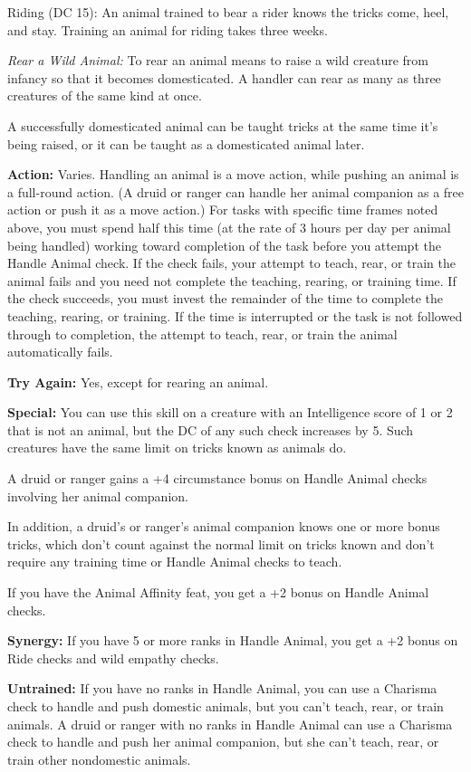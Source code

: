 \documentclass{article}
\begin{document}
Riding (DC 15): An animal trained to bear a rider knows the tricks come, heel, 
and stay. Training an animal for riding takes three weeks.

\vspace{12pt}
\textit{Rear a Wild Animal: }To rear an animal means to raise a wild creature from 
infancy so that it becomes domesticated. A handler can rear as many as three creatures 
of the same kind at once.

A successfully domesticated animal can be taught tricks at the same time it's being 
raised, or it can be taught as a domesticated animal later.

\textbf{Action:} Varies. Handling an animal is a move action, while pushing an 
animal is a full-round action. (A druid or ranger can handle her animal companion 
as a free action or push it as a move action.) For tasks with specific time frames 
noted above, you must spend half this time (at the rate of 3 hours per day per 
animal being handled) working toward completion of the task before you attempt 
the Handle Animal check. If the check fails, your attempt to teach, rear, or train 
the animal fails and you need not complete the teaching, rearing, or training time. 
If the check succeeds, you must invest the remainder of the time to complete the 
teaching, rearing, or training. If the time is interrupted or the task is not followed 
through to completion, the attempt to teach, rear, or train the animal automatically 
fails.

\textbf{Try Again:} Yes, except for rearing an animal.

\textbf{Special:} You can use this skill on a creature with an Intelligence score 
of 1 or 2 that is not an animal, but the DC of any such check increases by 5. Such 
creatures have the same limit on tricks known as animals do.

A druid or ranger gains a +4 circumstance bonus on Handle Animal checks involving 
her animal companion.

In addition, a druid's or ranger's animal companion knows one or more bonus tricks, 
which don't count against the normal limit on tricks known and don't require any 
training time or Handle Animal checks to teach.

If you have the Animal Affinity feat, you get a +2 bonus on Handle Animal checks.

\textbf{Synergy:} If you have 5 or more ranks in Handle Animal, you get a +2 bonus 
on Ride checks and wild empathy checks.

\textbf{Untrained:} If you have no ranks in Handle Animal, you can use a Charisma 
check to handle and push domestic animals, but you can't teach, rear, or train 
animals. A druid or ranger with no ranks in Handle Animal can use a Charisma check 
to handle and push her animal companion, but she can't teach, rear, or train other 
nondomestic animals.

\newpage
\end{document}
